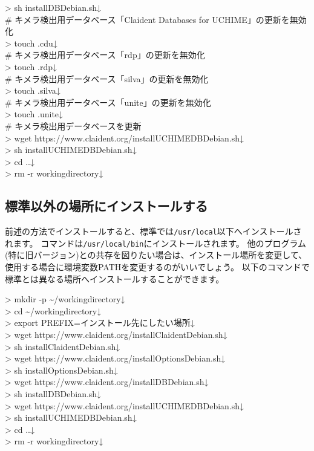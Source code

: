 \documentclass[titlepage,10pt,a4paper]{jsbook}
\newenvironment{cmd}{\begin{oframed}\raggedright\ttfamily\footnotesize\setlength{\baselineskip}{1.4em}}{\end{oframed}\vspace{-1em}}
\begin{document}
\begin{cmd}
{\textgreater} sh installDB{\textunderscore}Debian.sh↓\\
\# キメラ検出用データベース「Claident Databases for UCHIME」の更新を無効化\\
{\textgreater} touch .cdu↓\\
\# キメラ検出用データベース「rdp」の更新を無効化\\
{\textgreater} touch .rdp↓\\
\# キメラ検出用データベース「silva」の更新を無効化\\
{\textgreater} touch .silva↓\\
\# キメラ検出用データベース「unite」の更新を無効化\\
{\textgreater} touch .unite↓\\
\# キメラ検出用データベースを更新\\
{\textgreater} wget https://www.claident.org/installUCHIMEDB{\textunderscore}Debian.sh↓\\
{\textgreater} sh installUCHIMEDB{\textunderscore}Debian.sh↓\\
{\textgreater} cd ..↓\\
{\textgreater} rm -r workingdirectory↓
\end{cmd}

\subsection{標準以外の場所にインストールする}

前述の方法でインストールすると、標準では\texttt{/usr/local}以下へインストールされます。
コマンドは\texttt{/usr/local/bin}にインストールされます。
他のプログラム(特に旧バージョン)との共存を図りたい場合は、インストール場所を変更して、使用する場合に環境変数PATHを変更するのがいいでしょう。
以下のコマンドで標準とは異なる場所へインストールすることができます。

\begin{cmd}
{\textgreater} mkdir -p {\textasciitilde}/workingdirectory↓\\
{\textgreater} cd {\textasciitilde}/workingdirectory↓\\
{\textgreater} export PREFIX=インストール先にしたい場所↓\\
{\textgreater} wget https://www.claident.org/installClaident{\textunderscore}Debian.sh↓\\
{\textgreater} sh installClaident{\textunderscore}Debian.sh↓\\
{\textgreater} wget https://www.claident.org/installOptions{\textunderscore}Debian.sh↓\\
{\textgreater} sh installOptions{\textunderscore}Debian.sh↓\\
{\textgreater} wget https://www.claident.org/installDB{\textunderscore}Debian.sh↓\\
{\textgreater} sh installDB{\textunderscore}Debian.sh↓\\
{\textgreater} wget https://www.claident.org/installUCHIMEDB{\textunderscore}Debian.sh↓\\
{\textgreater} sh installUCHIMEDB{\textunderscore}Debian.sh↓\\
{\textgreater} cd ..↓\\
{\textgreater} rm -r workingdirectory↓
\end{cmd}
\end{document}
